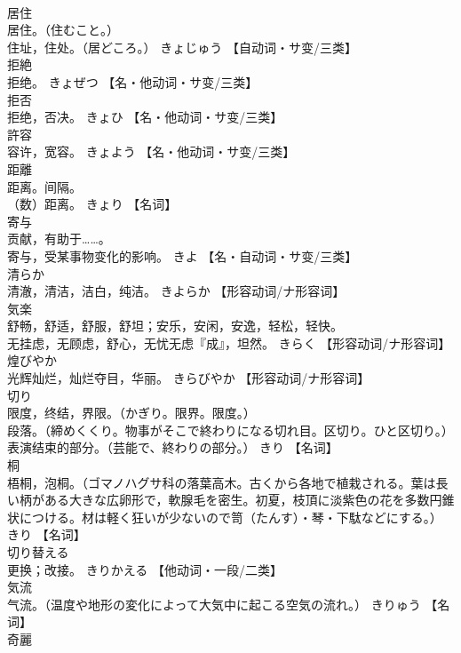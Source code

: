 \documentclass[8pt]{extreport}
\begin{document}
\begin{CJK}{UTF8}{min}
\\	居住	
\\	居住。（住むこと。） 
\\	住址，住处。（居どころ。）	きょじゅう		【自动词・サ变/三类】
\\	拒絶	
\\	拒绝。	きょぜつ		【名・他动词・サ变/三类】
\\	拒否	
\\	拒绝，否决。	きょひ		【名・他动词・サ变/三类】
\\	許容	
\\	容许，宽容。	きょよう		【名・他动词・サ变/三类】
\\	距離	
\\	距离。间隔。 
\\	（数）距离。	きょり		【名词】
\\	寄与	
\\	贡献，有助于……。 
\\	寄与，受某事物变化的影响。	きよ		【名・自动词・サ变/三类】
\\	清らか	
\\	清澈，清洁，洁白，纯洁。	きよらか		【形容动词/ナ形容词】
\\	気楽	
\\	舒畅，舒适，舒服，舒坦；安乐，安闲，安逸，轻松，轻快。 
\\	无挂虑，无顾虑，舒心，无忧无虑『成』，坦然。	きらく		【形容动词/ナ形容词】
\\	煌びやか	
\\	光辉灿烂，灿烂夺目，华丽。	きらびやか		【形容动词/ナ形容词】
\\	切り	
\\	限度，终结，界限。（かぎり。限界。限度。） 
\\	段落。（締めくくり。物事がそこで終わりになる切れ目。区切り。ひと区切り。） 
\\	表演结束的部分。（芸能で、終わりの部分。）	きり		【名词】
\\	桐	
\\	梧桐，泡桐。（ゴマノハグサ科の落葉高木。古くから各地で植栽される。葉は長い柄がある大きな広卵形で，軟腺毛を密生。初夏，枝頂に淡紫色の花を多数円錐状につける。材は軽く狂いが少ないので笥（たんす）・琴・下駄などにする。）	きり		【名词】
\\	切り替える	
\\	更换；改接。	きりかえる		【他动词・一段/二类】
\\	気流	
\\	气流。（温度や地形の変化によって大気中に起こる空気の流れ。）	きりゅう		【名词】
\\	奇麗	

\end{CJK}
\end{document}
